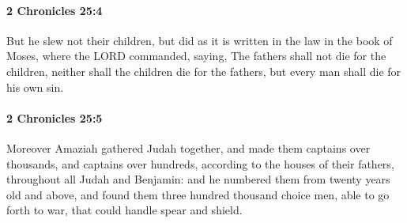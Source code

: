 		\paragraph{2 Chronicles 25:4} %
			\label{2CHRONICLES-25-4}

			But he slew not their children, but did as it is written in the law in the book of Moses, where the LORD commanded, saying, The fathers shall not die for the children, neither shall the children die for the fathers, but every man shall die for his own sin.


		\paragraph{2 Chronicles 25:5} %
			\label{2CHRONICLES-25-5}

			Moreover Amaziah gathered Judah together, and made them captains over thousands, and captains over hundreds, according to the houses of their fathers, throughout all Judah and Benjamin: and he numbered them from twenty years old and above, and found them three hundred thousand choice men, able to go forth to war, that could handle spear and shield.

